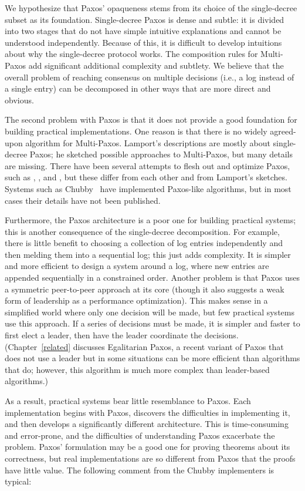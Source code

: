 We hypothesize that Paxos' opaqueness stems from its choice of the
single-decree subset as its foundation. Single-decree
Paxos is dense and subtle: it is divided into two stages that do
not have simple intuitive explanations and cannot be understood
independently. Because of this, it is difficult to
develop intuitions about why the single-decree protocol works.
The composition rules for Multi-Paxos add significant additional
complexity and subtlety. We believe that the overall
problem of reaching consensus on multiple decisions (i.e., a log instead
of a single entry) can be decomposed in other ways that are more
direct and obvious.

The second problem with Paxos is that it does not provide a good
foundation
for building practical implementations. One reason is that
there is no widely agreed-upon algorithm for Multi-Paxos.
Lamport's descriptions are mostly about single-decree Paxos;
he sketched possible approaches to Multi-Paxos, but many
details are missing. There have been several attempts to flesh out and
optimize Paxos, such as \cite{Mazieres:2007}, \cite{Renesse:2011},
and \cite{Kirsch:2008},
but these differ from each other and from Lamport's sketches.
Systems such as Chubby~\cite{Chandra:2007} have implemented
Paxos-like algorithms, but in most cases their details have not been
published.


Furthermore, the Paxos
architecture is a poor one
for building practical systems; this
is another consequence of the
single-decree decomposition. For example, there is
little benefit to
choosing a collection of log entries independently and then melding
them into a sequential log; this just adds complexity.  It is simpler
and more efficient to design a system around a log, where new
entries are appended sequentially in a constrained order.
Another problem is that Paxos
uses a symmetric peer-to-peer approach at its core (though it
also suggests a weak form of leadership as a performance
optimization). This makes
sense in a simplified world where only one decision will be made,
but few practical systems use this approach. If a series of decisions
must be made, it is simpler and faster to first elect a
leader, then have the leader coordinate the decisions.
(Chapter~\ref{related} discusses Egalitarian Paxos, a recent
variant of Paxos that does not use a leader but in some situations can
be more efficient than algorithms that do; however, this algorithm is
much more complex than leader-based algorithms.)

As a result, practical systems bear little resemblance to Paxos.
Each implementation begins with Paxos, discovers the difficulties in
implementing it, and then develops a significantly different architecture.
This is time-consuming and error-prone, and the difficulties of
understanding Paxos exacerbate the problem.
Paxos' formulation may be a good one for proving theorems about
its correctness, but real implementations are so
different from Paxos that the proofs have little value. The following
comment from the Chubby implementers is typical:

